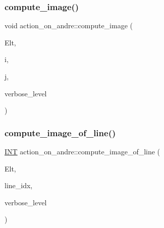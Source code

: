 \subsubsection{\texorpdfstring{compute\+\_\+image()}{compute\_image()}}
{\footnotesize\ttfamily void action\+\_\+on\+\_\+andre\+::compute\+\_\+image (\begin{DoxyParamCaption}\item[{\mbox{\hyperlink{galois_8h_a09fddde158a3a20bd2dcadb609de11dc}{I\+NT}} $\ast$}]{Elt,  }\item[{\mbox{\hyperlink{galois_8h_a09fddde158a3a20bd2dcadb609de11dc}{I\+NT}}}]{i,  }\item[{\mbox{\hyperlink{galois_8h_a09fddde158a3a20bd2dcadb609de11dc}{I\+NT}} \&}]{j,  }\item[{\mbox{\hyperlink{galois_8h_a09fddde158a3a20bd2dcadb609de11dc}{I\+NT}}}]{verbose\+\_\+level }\end{DoxyParamCaption})}

\mbox{\label{classaction__on__andre_a0d19fcc32c95cc25a160d0fdb56ed6c5}} 
\subsubsection{\texorpdfstring{compute\+\_\+image\+\_\+of\+\_\+line()}{compute\_image\_of\_line()}}
{\footnotesize\ttfamily \mbox{\hyperlink{galois_8h_a09fddde158a3a20bd2dcadb609de11dc}{I\+NT}} action\+\_\+on\+\_\+andre\+::compute\+\_\+image\+\_\+of\+\_\+line (\begin{DoxyParamCaption}\item[{\mbox{\hyperlink{galois_8h_a09fddde158a3a20bd2dcadb609de11dc}{I\+NT}} $\ast$}]{Elt,  }\item[{\mbox{\hyperlink{galois_8h_a09fddde158a3a20bd2dcadb609de11dc}{I\+NT}}}]{line\+\_\+idx,  }\item[{\mbox{\hyperlink{galois_8h_a09fddde158a3a20bd2dcadb609de11dc}{I\+NT}}}]{verbose\+\_\+level }\end{DoxyParamCaption})}

\mbox{\label{classaction__on__andre_a81a54e6434b63463b9389f700136dea3}} 
